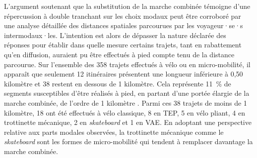 \begin{refsegment}
L'argument soutenant que la substitution de la marche combinée témoigne d'une répercussion à double tranchant sur les choix modaux peut être corroboré par une analyse détaillée des distances spatiales parcourues par les voyageur·se·s intermodaux·les. L'intention est alors de dépasser la nature déclarée des réponses pour établir dans quelle mesure certains trajets, tant en rabattement qu'en diffusion, auraient pu être effectués à pied compte tenu de la distance parcourue. Sur l'ensemble des 358 trajets effectués à vélo ou en micro-mobilité, il apparaît que seulement 12 itinéraires présentent une longueur inférieure à 0,50 kilomètre et 38 restent en dessous de 1 kilomètre. Cela représente 11~\% de segments susceptibles d'être réalisés à pied, en partant d'une portée élargie de la marche combinée, de l'ordre de 1 kilomètre \textcolor{blue}{\autocite[34]{canepa_bursting_2007}}. Parmi ces 38 trajets de moins de 1 kilomètre, 18 ont été effectués à vélo classique, 8 en \acrshort{TEP}, 5 en vélo pliant, 4 en trottinette mécanique, 2 en \textsl{skateboard} et 1 en \acrshort{VAE}. En adoptant une perspective relative aux parts modales observées, la trottinette mécanique comme le \textsl{skateboard} sont les formes de micro-mobilité qui tendent à remplacer davantage la marche combinée.%


\end{refsegment}
